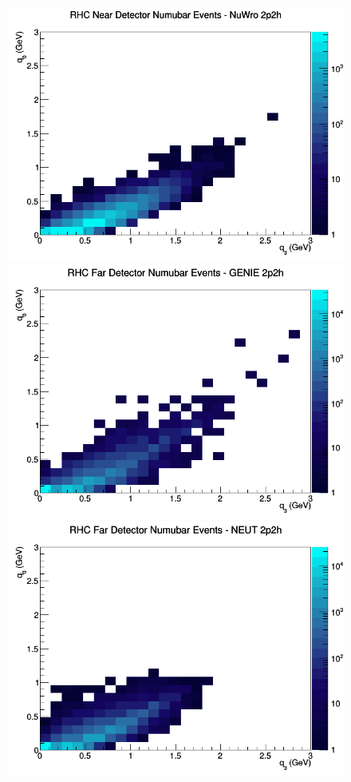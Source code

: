 \begin{figure}[h]
\includegraphics[width=\linewidth]{eff_q0_q3/GAr/2p2h_RHC_ND_numubar_q3_q0_NuWro.png}
\endminipage
\newline
{}
\includegraphics[width=\linewidth]{eff_q0_q3/GAr/2p2h_RHC_FD_numubar_q3_q0_GENIE.png}
\endminipage
{}
\includegraphics[width=\linewidth]{eff_q0_q3/GAr/2p2h_RHC_FD_numubar_q3_q0_NEUT.png}

\end{figure}
